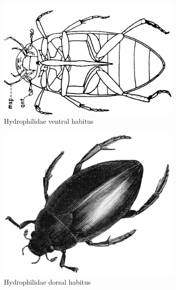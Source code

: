\documentclass[letterpaper, 11pt]{article}
\begin{document}
\begin{figure}[ht!]
  \centering
\begin{subfigure}[ht!]{0.4\textwidth}
    \includegraphics[width=\textwidth]{Hydrophilid1}
  \caption{Hydrophilidae ventral habitus \citep[][Fig. Fig. 13:36]{bhlitem126080aquatic}}
  \label{fig:hydrophilid1}
\end{subfigure}
    \qquad
\begin{subfigure}[ht!]{0.35\textwidth}
    \includegraphics[width=\textwidth]{hydrophilidDorsal.png}
  \caption{Hydrophilidae dorsal habitus \citep[][pg. 99]{brehm1877brehms}}
  \label{fig:hydrophilid2}
\end{subfigure}
    \caption{}\label{fig:hydrophilids}
\end{figure}
\end{document}
